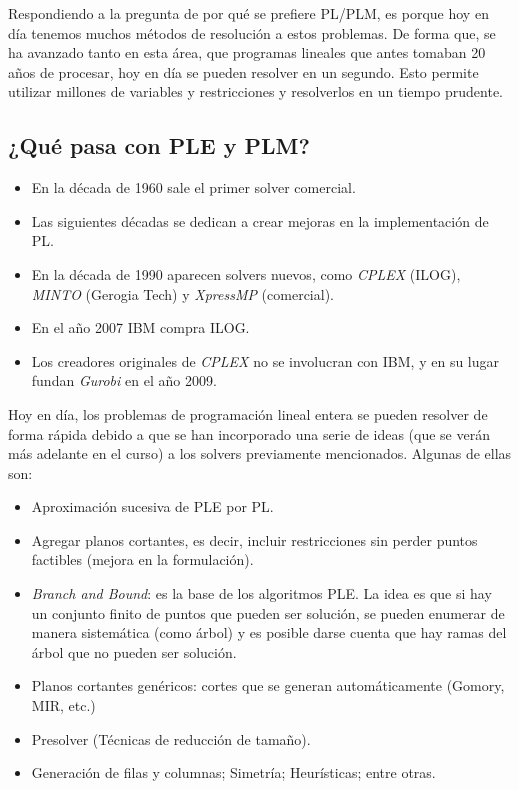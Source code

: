 \documentclass[10pt]{article}
\theoremstyle{plain}
\theoremstyle{definition}
\begin{document}
Respondiendo a la pregunta de por qué se prefiere PL/PLM, es porque hoy en día tenemos muchos métodos de resolución a estos problemas. De forma que, se ha avanzado tanto en esta área, que programas lineales que antes tomaban 20 años de procesar, hoy en día se pueden resolver en un segundo. Esto permite utilizar millones de variables y restricciones y resolverlos en un tiempo prudente.

\subsection*{¿Qué pasa con PLE y PLM?}
\begin{itemize}
    \item En la década de 1960 sale el primer solver comercial.
    \item Las siguientes décadas se dedican a crear mejoras en la implementación de PL.
    \item En la década de 1990 aparecen solvers nuevos, como \textit{CPLEX} (ILOG), \textit{MINTO} (Gerogia Tech) y \textit{XpressMP} (comercial).
    \item En el año 2007 IBM compra ILOG.
    \item Los creadores originales de \textit{CPLEX} no se involucran con IBM, y en su lugar fundan \textit{Gurobi} en el año 2009.
\end{itemize}

Hoy en día, los problemas de programación lineal entera se pueden resolver de forma rápida debido a que se han incorporado una serie de ideas (que se verán más adelante en el curso) a los solvers previamente mencionados. Algunas de ellas son:
\begin{itemize}
    \item Aproximación sucesiva de PLE por PL.
    \item Agregar planos cortantes, es decir, incluir restricciones sin perder puntos factibles (mejora en la formulación).
    \item \textit{Branch and Bound}: es la base de los algoritmos PLE. La idea es que si hay un conjunto finito de puntos que pueden ser solución, se pueden enumerar de manera sistemática (como árbol) y es posible darse cuenta que hay ramas del árbol que no pueden ser solución.
    \item Planos cortantes genéricos: cortes que se generan automáticamente (Gomory, MIR, etc.)
    \item Presolver (Técnicas de reducción de tamaño).
    \item Generación de filas y columnas; Simetría; Heurísticas; entre otras.
\end{itemize}
\end{document}
